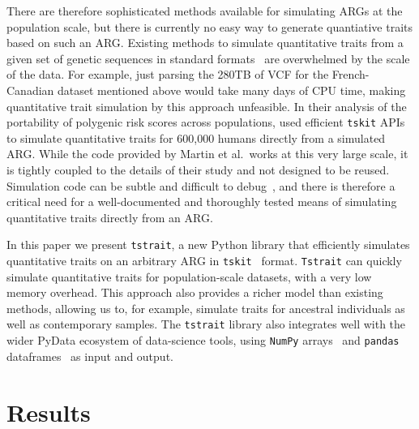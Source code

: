 \documentclass[unnumsec,webpdf,modern,large,namedate]{oup-authoring-template}%
\begin{document}
There are therefore sophisticated methods available for simulating
ARGs at the population scale, but there is currently no
easy way to generate quantiative traits based on such an ARG.
Existing methods to simulate quantitative traits from a given set of
genetic sequences in standard formats~\citep[e.g.][]{meyer2018,fernandes2020}
are overwhelmed by the scale of the data. For example,
just parsing the 280TB of VCF for the French-Canadian
dataset mentioned above would take many days of CPU time,
making quantitative trait simulation by this approach unfeasible.
In their analysis of the portability of polygenic risk
scores across populations, \citet{martin2017}
used efficient \texttt{tskit} APIs to simulate quantitative
traits for 600,000 humans directly from a simulated ARG.
While the code provided by Martin et al.\ works at this
very large scale, it is tightly coupled to the details of their study
and not designed to be reused.
Simulation code can be subtle and difficult to
debug~\citep{ragsdale2020lessons}, and there
is therefore a critical need for a well-documented and
thoroughly tested means of simulating quantitative
traits directly from an ARG.

In this paper we present \texttt{tstrait}, a new Python library that
efficiently simulates quantitative traits on an arbitrary ARG
in \texttt{tskit}~\citep{ralph2020} format.
\texttt{Tstrait} can
quickly simulate quantitative traits for population-scale datasets,
with a very low memory overhead. This approach also provides a
richer model than existing methods,
allowing us to, for example, simulate traits for
ancestral individuals as well as contemporary samples.
The \texttt{tstrait} library also integrates well with the wider
PyData ecosystem of data-science tools,
using
\texttt{NumPy} arrays~\citep{numpy} and
\texttt{pandas} dataframes~\citep{pandas}
as input and output.

\section{Results}
\end{document}
